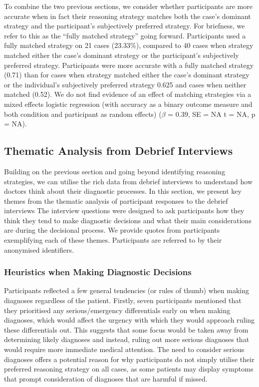 \documentclass[a4paper, nobind]{templates/ociamthesis}
\begin{document}
\hfill\break

To combine the two previous sections, we consider whether participants are more accurate when in fact their reasoning strategy matches both the case's dominant strategy and the participant's subjectively preferred strategy. For briefness, we refer to this as the ``fully matched strategy'' going forward. Participants used a fully matched strategy on 21 cases (23.33\%), compared to 40 cases when strategy matched either the case's dominant strategy or the participant's subjectively preferred strategy. Participants were more accurate with a fully matched strategy (0.71) than for cases when strategy matched either the case's dominant strategy or the individual's subjectively preferred strategy 0.625 and cases when neither matched (0.52). We do not find evidence of an effect of matching strategies via a mixed effects logistic regression (with accuracy as a binary outcome measure and both condition and participant as random effects) (\(\beta\) = 0.39, SE = NA t = NA, p = NA).

\subsection{Thematic Analysis from Debrief Interviews}\label{thematic-analysis-from-debrief-interviews}

Building on the previous section and going beyond identifying reasoning strategies, we can utilise the rich data from debrief interviews to understand how doctors think about their diagnostic processes. In this section, we present key themes from the thematic analysis of participant responses to the debrief interviews The interview questions were designed to ask participants how they think they tend to make diagnostic decisions and what their main considerations are during the decisional process. We provide quotes from participants exemplifying each of these themes. Participants are referred to by their anonymised identifiers.

\subsubsection{Heuristics when Making Diagnostic Decisions}\label{heuristics-when-making-diagnostic-decisions}

Participants reflected a few general tendencies (or rules of thumb) when making diagnoses regardless of the patient. Firstly, seven participants mentioned that they prioritised any serious/emergency differentials early on when making diagnoses, which would affect the urgency with which they would approach ruling these differentials out. This suggests that some focus would be taken away from determining likely diagnoses and instead, ruling out more serious diagnoses that would require more immediate medical attention. The need to consider serious diagnoses offers a potential reason for why participants do not simply utilise their preferred reasoning strategy on all cases, as some patients may display symptoms that prompt consideration of diagnoses that are harmful if missed.\\
\end{document}
